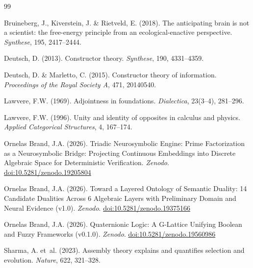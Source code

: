 \documentclass[11pt,a4paper]{article}
\begin{document}

\begin{thebibliography}{99}

Bruineberg, J., Kiverstein, J. \& Rietveld, E. (2018).
The anticipating brain is not a scientist: the free-energy principle
from an ecological-enactive perspective.
\textit{Synthese}, 195, 2417--2444.

Deutsch, D. (2013).
Constructor theory.
\textit{Synthese}, 190, 4331--4359.

Deutsch, D. \& Marletto, C. (2015).
Constructor theory of information.
\textit{Proceedings of the Royal Society A}, 471, 20140540.

Lawvere, F.W. (1969).
Adjointness in foundations.
\textit{Dialectica}, 23(3--4), 281--296.

Lawvere, F.W. (1996).
Unity and identity of opposites in calculus and physics.
\textit{Applied Categorical Structures}, 4, 167--174.

Ornelas Brand, J.A. (2026).
Triadic Neurosymbolic Engine: Prime Factorization as a Neurosymbolic
Bridge: Projecting Continuous Embeddings into Discrete Algebraic Space
for Deterministic Verification.
\textit{Zenodo}.
\href{https://doi.org/10.5281/zenodo.19205804}{doi:10.5281/zenodo.19205804}

Ornelas Brand, J.A. (2026).
Toward a Layered Ontology of Semantic Duality: 14 Candidate Dualities
Across 6 Algebraic Layers with Preliminary Domain and Neural Evidence
(v1.0).
\textit{Zenodo}.
\href{https://doi.org/10.5281/zenodo.19375166}{doi:10.5281/zenodo.19375166}

Ornelas Brand, J.A. (2026).
Quaternionic Logic: A G-Lattice Unifying Boolean and Fuzzy Frameworks (v0.1.0).
\textit{Zenodo}.
\href{https://doi.org/10.5281/zenodo.19560986}{doi:10.5281/zenodo.19560986}

Sharma, A. et~al. (2023).
Assembly theory explains and quantifies selection and evolution.
\textit{Nature}, 622, 321--328.

\end{thebibliography}
\end{document}
